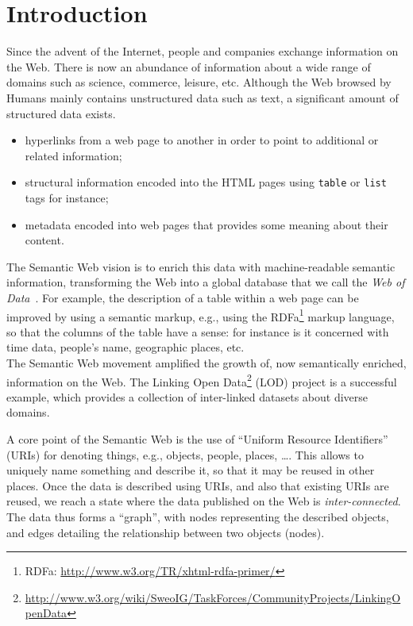 \chapter{Introduction}
\label{chap1:introduction}

Since the advent of the Internet, people and companies exchange information on the Web. There is now an abundance of information about a wide range of domains such as science, commerce, leisure, etc. Although the Web browsed by Humans mainly contains unstructured data such as text, a significant amount of structured data exists.

\begin{itemize}
\item hyperlinks from a web page to another in order to point to additional or related information;
\item structural information encoded into the HTML pages using \texttt{table} or \texttt{list} tags for instance;
\item metadata encoded into web pages that provides some meaning about their content.
\end{itemize}

The Semantic Web vision is to enrich this data with machine-readable semantic information, transforming the Web into a global database that we call the \emph{Web of Data}~\cite{bizer:2009:linked}. For example, the description of a table within a web page can be improved by using a semantic markup, e.g., using the RDFa\footnote{RDFa: \url{http://www.w3.org/TR/xhtml-rdfa-primer/}} markup language, so that the columns of the table have a sense: for instance is it concerned with time data, people's name, geographic places, etc.\\

The Semantic Web movement amplified the growth of, now semantically enriched, information on the Web. The Linking Open Data\footnote{\url{http://www.w3.org/wiki/SweoIG/TaskForces/CommunityProjects/LinkingOpenData}} (LOD) project is a successful example, which provides a collection of inter-linked datasets about diverse domains.

A core point of the Semantic Web is the use of ``Uniform Resource Identifiers'' (URIs) for denoting things, e.g., objects, people, places, \ldots. This allows to uniquely name something and describe it, so that it may be reused in other places. Once the data is described using URIs, and also that existing URIs are reused, we reach a state where the data published on the Web is \emph{inter-connected}. The data thus forms a ``graph'', with nodes representing the described objects, and edges detailing the relationship between two objects (nodes).

